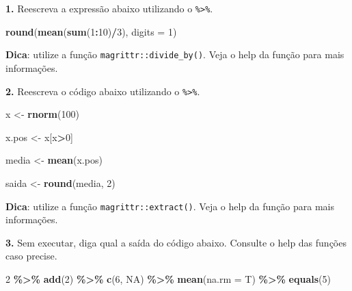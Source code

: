 \documentclass[
]{book}
\newenvironment{Shaded}{\begin{snugshade}}{\end{snugshade}}
\newcommand{\AttributeTok}[1]{\textcolor[rgb]{0.13,0.29,0.53}{#1}}
\newcommand{\ConstantTok}[1]{\textcolor[rgb]{0.56,0.35,0.01}{#1}}
\newcommand{\DecValTok}[1]{\textcolor[rgb]{0.00,0.00,0.81}{#1}}
\newcommand{\FunctionTok}[1]{\textcolor[rgb]{0.13,0.29,0.53}{\textbf{#1}}}
\newcommand{\NormalTok}[1]{#1}
\newcommand{\OtherTok}[1]{\textcolor[rgb]{0.56,0.35,0.01}{#1}}
\newcommand{\SpecialCharTok}[1]{\textcolor[rgb]{0.81,0.36,0.00}{\textbf{#1}}}
\begin{document}
\textbf{1.} Reescreva a expressão abaixo utilizando o \texttt{\%\textgreater{}\%}.

\begin{Shaded}
\begin{Highlighting}[]
\FunctionTok{round}\NormalTok{(}\FunctionTok{mean}\NormalTok{(}\FunctionTok{sum}\NormalTok{(}\DecValTok{1}\SpecialCharTok{:}\DecValTok{10}\NormalTok{)}\SpecialCharTok{/}\DecValTok{3}\NormalTok{), }\AttributeTok{digits =} \DecValTok{1}\NormalTok{)}
\end{Highlighting}
\end{Shaded}

\textbf{Dica}: utilize a função \texttt{magrittr::divide\_by()}. Veja o help da
função para mais informações.

\textbf{2.} Reescreva o código abaixo utilizando o \texttt{\%\textgreater{}\%}.

\begin{Shaded}
\begin{Highlighting}[]
\NormalTok{x }\OtherTok{\textless{}{-}} \FunctionTok{rnorm}\NormalTok{(}\DecValTok{100}\NormalTok{)}

\NormalTok{x.pos }\OtherTok{\textless{}{-}}\NormalTok{ x[x}\SpecialCharTok{\textgreater{}}\DecValTok{0}\NormalTok{]}

\NormalTok{media }\OtherTok{\textless{}{-}} \FunctionTok{mean}\NormalTok{(x.pos)}

\NormalTok{saida }\OtherTok{\textless{}{-}} \FunctionTok{round}\NormalTok{(media, }\DecValTok{2}\NormalTok{)}
\end{Highlighting}
\end{Shaded}

\textbf{Dica}: utilize a função \texttt{magrittr::extract()}. Veja o help da função
para mais informações.

\textbf{3.} Sem executar, diga qual a saída do código abaixo. Consulte o help
das funções caso precise.

\begin{Shaded}
\begin{Highlighting}[]
\DecValTok{2} \SpecialCharTok{\%\textgreater{}\%}
  \FunctionTok{add}\NormalTok{(}\DecValTok{2}\NormalTok{) }\SpecialCharTok{\%\textgreater{}\%}
  \FunctionTok{c}\NormalTok{(}\DecValTok{6}\NormalTok{, }\ConstantTok{NA}\NormalTok{) }\SpecialCharTok{\%\textgreater{}\%}
  \FunctionTok{mean}\NormalTok{(}\AttributeTok{na.rm =}\NormalTok{ T) }\SpecialCharTok{\%\textgreater{}\%}
  \FunctionTok{equals}\NormalTok{(}\DecValTok{5}\NormalTok{)}
\end{Highlighting}
\end{Shaded}
\end{document}
